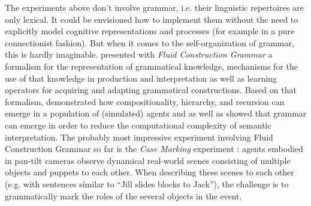 The experiments above don't involve grammar, i.e. their linguistic
repertoires are only lexical. It could be envisioned how to implement
them without the need to explicitly model cognitive representations
and processes (for example in a pure connectionist fashion). But when
it comes to the self-organization of grammar, this is hardly
imaginable. \cite{steels12computational,debeule05hierarchy,steels05linking,steels06unify}
presented with \emph{Fluid Construction Grammar} a formalism for the
representation of grammatical knowledge, mechanisms for the use of
that knowledge in production and interpretation as well as learning
operators for acquiring and adapting grammatical constructions. Based
on that formalism, \cite{debeule08emergence} demonstrated how
compositionality, hierarchy, and recursion can emerge in a population
of (simulated) agents and \cite{steels05what} as well as
\cite{steels06how-grammar} showed that grammar can emerge in order to
reduce the computational complexity of semantic interpretation. The
probably most impressive experiment involving Fluid Construction
Grammar so far is the \emph{Case Marking} experiment
\citep{steels02simulating,vantrijp08emergence}: agents embodied in
pan-tilt cameras observe dynamical real-world scenes consisting of
multiple objects and puppets to each other. When describing these
scenes to each other (e.g. with sentences similar to ``Jill slides
blocks to Jack''), the challenge is to grammatically mark the roles of
the several objects in the event.





